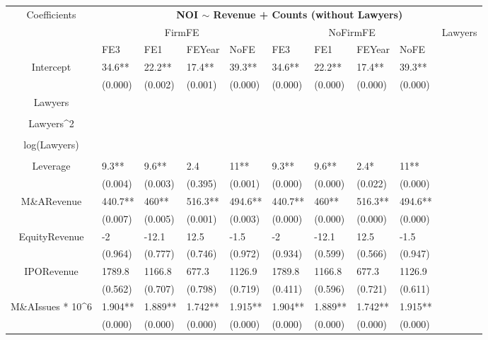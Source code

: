 \documentclass{article}
\begin{document}
\begin{table}[H]
\centering
\begin{tabular}{|clllllllll|}
\hline
\multirow{3}{*}{Coefficients} & \multicolumn{9}{c|}{\textbf{NOI $\sim$ Revenue + Counts (without Lawyers)}} \\
\cline{2-10}
& \multicolumn{4}{c}{FirmFE} & \multicolumn{4}{c}{NoFirmFE} & \multirow{2}{*}{Lawyers} \\
\cline{2-9}
& FE3 & FE1 & FEYear & NoFE & FE3 & FE1 & FEYear & NoFE &  \\
\hline
 
Intercept & 34.6** & 22.2** & 17.4** & 39.3** & 34.6** & 22.2** & 17.4** & 39.3** & \\ 
   & (0.000) & (0.002) & (0.001) & (0.000) & (0.000) & (0.000) & (0.000) & (0.000) & \\ 
  Lawyers &  &  &  &  &  &  &  &  & \\ 
   &  &  &  &  &  &  &  &  & \\ 
  Lawyers^2 &  &  &  &  &  &  &  &  & \\ 
   &  &  &  &  &  &  &  &  & \\ 
  log(Lawyers) &  &  &  &  &  &  &  &  & \\ 
   &  &  &  &  &  &  &  &  & \\ 
  Leverage & 9.3** & 9.6** & 2.4 & 11** & 9.3** & 9.6** & 2.4* & 11** & \\ 
   & (0.004) & (0.003) & (0.395) & (0.001) & (0.000) & (0.000) & (0.022) & (0.000) & \\ 
  M\&ARevenue & 440.7** & 460** & 516.3** & 494.6** & 440.7** & 460** & 516.3** & 494.6** & \\ 
   & (0.007) & (0.005) & (0.001) & (0.003) & (0.000) & (0.000) & (0.000) & (0.000) & \\ 
  EquityRevenue & -2 & -12.1 & 12.5 & -1.5 & -2 & -12.1 & 12.5 & -1.5 & \\ 
   & (0.964) & (0.777) & (0.746) & (0.972) & (0.934) & (0.599) & (0.566) & (0.947) & \\ 
  IPORevenue & 1789.8 & 1166.8 & 677.3 & 1126.9 & 1789.8 & 1166.8 & 677.3 & 1126.9 & \\ 
   & (0.562) & (0.707) & (0.798) & (0.719) & (0.411) & (0.596) & (0.721) & (0.611) & \\ 
  M\&AIssues * 10^6 & 1.904** & 1.889** & 1.742** & 1.915** & 1.904** & 1.889** & 1.742** & 1.915** & \\ 
   & (0.000) & (0.000) & (0.000) & (0.000) & (0.000) & (0.000) & (0.000) & (0.000) & \\ 

\end{tabular}
\end{table}
\end{document}
